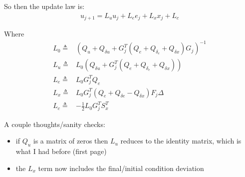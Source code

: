 \documentclass[legalpaper,landscape]{article}
\begin{document}
So then the update law is:
\begin{align}
u_{j+1} =  L_u u_j + L_e e_j + L_x x_{j} + L_c
\end{align}

Where
\begin{align}
L_0 \triangleq & \left(Q_u + Q_{\delta u}  + G_j^T\left( Q_e + Q_{\delta_e} + Q_{\delta x} \right) G_j\right)^{-1} \\
L_u \triangleq &  L_0\left( Q_{\delta u} + G_j^T\left( Q_e + Q_{\delta_e} + Q_{\delta x} \right) \right) \\
L_e \triangleq &  L_0 G_j^T Q_e\\
L_x \triangleq &  L_0 G_j^T \left( Q_e + Q_{\delta e} - Q_{\delta x}\right)F_j \Delta\\
L_c \triangleq &  -\frac{1}{2} L_0 G_j^T S_x^T
\end{align}

A couple thoughts/sanity checks:
\begin{itemize}
	\item if $Q_u$ is a matrix of zeros then $L_u$ reduces to the identity matrix, which is what I had before (first page)
	\item the $L_x$ term now includes the final/initial condition deviation
\end{itemize} 
\end{document}
